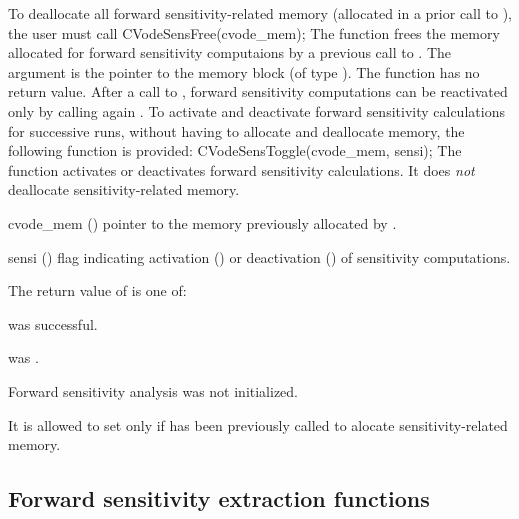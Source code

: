 To deallocate all forward sensitivity-related memory (allocated in a prior call
to ), the user must call
{
  CVodeSensFree(cvode\_mem);
}
{
  The function  frees the memory allocated for forward sensitivity 
  computaions by a previous call to .
}
{
  The argument is the pointer to the {\cvodes} memory block (of type ).
}
{
  The function  has no return value.
}
{
  After a call to , forward sensitivity computations can be reactivated
  only by calling again .
}
To activate and deactivate forward sensitivity calculations for successive {\cvodes} runs,
without having to allocate and deallocate memory, the following function is provided:
{
  CVodeSensToggle(cvode\_mem, sensi);
}
{
  The function  activates or deactivates forward sensitivity 
  calculations. It does {\em not} deallocate sensitivity-related memory.
}
{
  \begin{args}
  \item[cvode\_mem] ()
    pointer to the memory previously allocated by .
  \item[sensi] ()
    flag indicating activation () or deactivation
    () of sensitivity computations.
  \end{args}
}
{
  The return value  of  is one of:
  \begin{args}
  \item[\Id{CV\_SUCCESS}] 
     was successful.
  \item[\Id{CV\_MEM\_NULL}] 
     was .
  \item[\Id{CV\_NO\_SENS}] 
    Forward sensitivity analysis was not initialized.
  \end{args}
}
{
  It is allowed to set  only if  has been
  previously called to alocate sensitivity-related memory.
}


\subsection{Forward sensitivity extraction functions}\label{ss:sensi_get}

